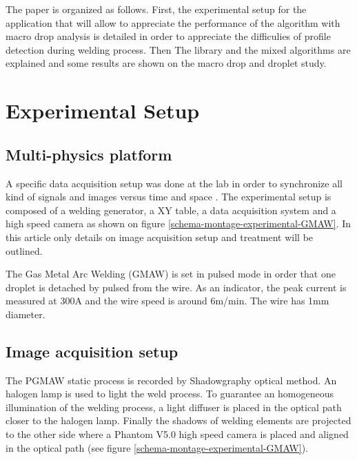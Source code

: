 \documentclass[12pt]{iopart}
\begin{document}
The paper is organized as follows. First, the experimental setup for the application
 that will allow to appreciate the performance of the algorithm with
  macro drop analysis is detailed in order to appreciate the difficulies of profile detection
during welding process. 
Then The library and the mixed algorithms are explained and some results are shown on the macro drop and droplet study.


\section{Experimental Setup}
\label{experimental_setup}

\subsection{Multi-physics platform}
\label{multi_physics_platform}


A specific data acquisition setup was done at the lab in order to
synchronize all kind of signals and images versus time and space \cite{ChapuisThesis}.
The experimental setup is composed of a welding generator, a XY table, a data acquisition
system and a high speed camera as shown on figure \ref{schema-montage-experimental-GMAW}.
In this article only details on image acquisition setup and treatment will be outlined.

The Gas Metal Arc Welding (GMAW) is set in pulsed mode in order that one droplet 
is detached by pulsed from the wire. As an indicator, the peak current is measured at 300A and the wire speed
is around 6m/min. The wire has 1mm diameter.


\subsection{ Image acquisition setup}
\label{image_acquisition_setup}

The PGMAW static process is recorded by Shadowgraphy optical method. 
An halogen lamp is used to light the weld process. To guarantee an homogeneous
illumination of the welding process, a light diffuser is placed
in the optical path closer to the halogen lamp. 
Finally the shadows of welding elements are projected to the other side where
 a Phantom V5.0 high speed camera is placed and aligned in
 the optical path (see figure \ref{schema-montage-experimental-GMAW}). 
\end{document}
